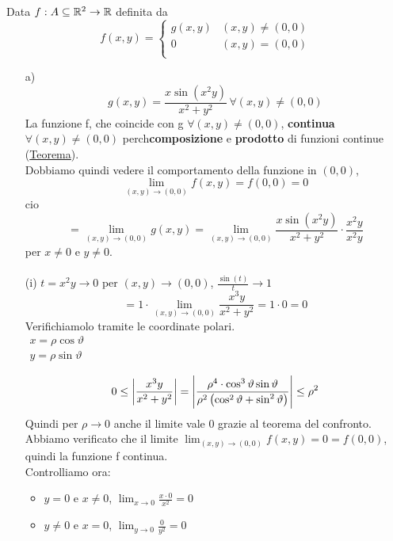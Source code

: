 \begin{eexercise}
  Data $f: A \subseteq \mathbb{R}^2 \to \mathbb{R}$ definita da $$f(x,y) = \left\{\begin{array}{cl}
    g(x,y) & (x,y) \neq (0,0) \\
    0 & (x,y) = (0,0) \\
  \end{array}\right.$$
  \begin{enumerate}
    \item[a)] $$g(x,y) = \frac{x\sin(x^2y)}{x^2+y^2} \,\forall (x,y) \not = (0,0)$$
              La funzione f, che coincide con g $\forall (x,y) \not = (0,0)$, \ace \textbf{continua} $\forall (x,y) \not = (0,0)$
              perch\ace \ace \textbf{composizione} e \textbf{prodotto} di funzioni continue (\underline{Teorema}). \\
              Dobbiamo quindi vedere il comportamento della funzione in $(0,0)$, $$\lim_{(x,y)\to (0,0)} f(x,y) = f(0,0) = 0$$
              cio\ace
              $$= \lim_{(x,y)\to (0,0)}g(x,y) = \lim_{(x,y)\to (0,0)} \frac{x\sin(x^2y)}{x^2+y^2} \cdot \frac{x^2y}{x^2y}$$
              per $x \neq 0$ e $y \neq 0$. \\\\
              (i) $t = x^2y \to 0$ per $(x,y)\to (0,0)$, $\frac{\sin(t)}{t} \to 1$ 
              $$ = 1 \cdot \lim_{(x,y)\to (0,0)}\frac{x^3y}{x^2+y^2} = 1 \cdot 0 = 0$$
              Verifichiamolo tramite le coordinate polari.\\
              $\begin{array}{l}
                x = \rho\cos\vartheta \\
                y = \rho\sin\vartheta \\
              \end{array}$
              $$0 \leq \left\lvert \frac{x^3y}{x^2+y^2} \right\rvert = \left\lvert \frac{\rho^4\cdot \cos^3\vartheta \sin\vartheta}
                {\rho^2\left(\cos^2\vartheta + \sin^2\vartheta\right)} \right\rvert \leq \rho^2$$
                Quindi per $\rho \to 0$ anche il limite vale 0 grazie al teorema del confronto. \\
                Abbiamo verificato che il limite $\lim_{(x,y)\to (0,0)} f(x,y) = 0 = f(0,0)$, quindi la funzione 
                f \ace continua. \\ 
                Controlliamo ora: 
                \begin{itemize}
                  \item $y = 0$ e $x\not = 0$, $\lim_{x\to 0}\frac{x\cdot 0}{x^2} = 0$
                  \item $y \not = 0$ e $x = 0$, $\lim_{y\to 0}\frac{0}{y^2} = 0$

\end{itemize}
\end{enumerate}
\end{eexercise}
